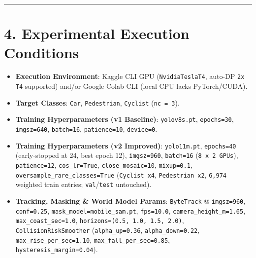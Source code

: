 \documentclass[10.5pt,a4paper]{article}
\begin{document}
\par\noindent\rule{\textwidth}{0.4pt}\par\medskip

\section{4. Experimental Execution Conditions}

\begin{itemize}[leftmargin=1.5em,itemsep=2pt]
\item \textbf{Execution Environment}: Kaggle CLI GPU (\texttt{NvidiaTeslaT4}, auto-DP \texttt{2x T4} supported) and/or Google Colab CLI (local CPU lacks PyTorch/CUDA).
\item \textbf{Target Classes}: \texttt{Car}, \texttt{Pedestrian}, \texttt{Cyclist} (\texttt{nc = 3}).
\item \textbf{Training Hyperparameters (v1 Baseline)}: \texttt{yolov8s.\allowbreak{}pt}, \texttt{epochs=30}, \texttt{imgsz=640}, \texttt{batch=16}, \texttt{patience=10}, \texttt{device=0}.
\item \textbf{Training Hyperparameters (v2 Improved)}: \texttt{yolo11m.\allowbreak{}pt}, \texttt{epochs=40} (early-stopped at 24, best epoch 12), \texttt{imgsz=960}, \texttt{batch=16} (\texttt{8 x 2 GPUs}), \texttt{patience=12}, \texttt{cos\_\allowbreak{}lr=True}, \texttt{close\_\allowbreak{}mosaic=10}, \texttt{mixup=0.\allowbreak{}1}, \texttt{oversample\_\allowbreak{}rare\_\allowbreak{}classes=True} (\texttt{Cyclist x4}, \texttt{Pedestrian x2}, \texttt{6,\allowbreak{}974} weighted train entries; \texttt{val}/\texttt{test} untouched).
\item \textbf{Tracking, Masking \& World Model Params}: \texttt{ByteTrack} @ \texttt{imgsz=960}, \texttt{conf=0.\allowbreak{}25}, \texttt{mask\_\allowbreak{}model=mobile\_\allowbreak{}sam.\allowbreak{}pt}, \texttt{fps=10.\allowbreak{}0}, \texttt{camera\_\allowbreak{}height\_\allowbreak{}m=1.\allowbreak{}65}, \texttt{max\_\allowbreak{}coast\_\allowbreak{}sec=1.\allowbreak{}0}, \texttt{horizons=(0.\allowbreak{}5,\allowbreak{} 1.\allowbreak{}0,\allowbreak{} 1.\allowbreak{}5,\allowbreak{} 2.\allowbreak{}0)}, \texttt{CollisionRiskSmoother} (\texttt{alpha\_\allowbreak{}up=0.\allowbreak{}36}, \texttt{alpha\_\allowbreak{}down=0.\allowbreak{}22}, \texttt{max\_\allowbreak{}rise\_\allowbreak{}per\_\allowbreak{}sec=1.\allowbreak{}10}, \texttt{max\_\allowbreak{}fall\_\allowbreak{}per\_\allowbreak{}sec=0.\allowbreak{}85}, \texttt{hysteresis\_\allowbreak{}margin=0.\allowbreak{}04}).
\end{itemize}
\end{document}
